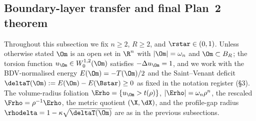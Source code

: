 %
%

\subsection{Boundary-layer transfer and final Plan~2 theorem}
\label{ssec:plan2-boundary-layer-assembly}

Throughout this subsection we fix $n\ge 2$, $R\ge 2$, and
$\rstar\in(0,1)$. Unless otherwise stated $\Om$ is an open set in $\R^n$
with $|\Om|=\omega_n$ and $\Om\subset B_R$; the torsion function
$u_\Om\in W^{1,2}_0(\Om)$ satisfies $-\Delta u_\Om=1$, and we work with
the BDV-normalised energy $E(\Om)=-T(\Om)/2$ and the Saint--Venant
deficit $\deltaT(\Om):=E(\Om)-E(\Bstar)\ge 0$ as fixed in the notation
register (\S3). The volume-radius foliation
$\Erho=\{u_\Om>t(\rho)\}$, $|\Erho|=\omega_n\rho^n$, the rescaled
$\Frho=\rho^{-1}\Erho$, the metric quotient $(\X,\dX)$, and the
profile-gap radius $\rhodelta=1-\kappa\sqrt{\deltaT(\Om)}$ are as in
the previous subsections.

